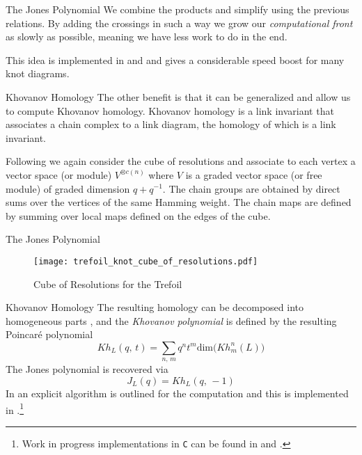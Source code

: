 \documentclass{beamer}
\begin{document}
    \begin{frame}{The Jones Polynomial}
        We combine the products and simplify using the previous relations.
        By adding the crossings in such a way we grow our
        \textit{computational front} as slowly as possible, meaning we have
        less work to do in the end.
        \par\hfill\par
        This idea is implemented in \cite{KatlasJones} and
        \cite{MaguireJones} and gives a considerable speed boost for many
        knot diagrams.
    \end{frame}
    \begin{frame}{Khovanov Homology}
        The other benefit is that it can be generalized and allow us to compute
        Khovanov homology. Khovanov homology is a link invariant that
        associates a chain complex to a link diagram, the homology of which
        is a link invariant.
        \par\hfill\par
        Following \cite{BarNatanKhovanovJones} we again consider the cube of
        resolutions and associate to each vertex a vector space (or module)
        $V^{\otimes{c(n)}}$ where $V$ is a graded vector space (or free module)
        of graded dimension $q+q^{-1}$. The chain groups are obtained by
        direct sums over the vertices of the same Hamming weight. The chain
        maps are defined by summing over local maps defined on the edges of
        the cube.
    \end{frame}
    \begin{frame}{The Jones Polynomial}
        \begin{figure}
            \centering
            \texttt{[image: trefoil\_knot\_cube\_of\_resolutions.pdf]}
            \caption{Cube of Resolutions for the Trefoil}
        \end{figure}
    \end{frame}
    \begin{frame}{Khovanov Homology}
        The resulting homology can be decomposed into homogeneous parts
        \cite{KatlasKhoHo}, and the \textit{Khovanov polynomial} is defined
        by the resulting Poincar\'{e} polynomial
        \begin{equation}
            Kh_{L}(q,\,t)=\sum_{n,\,m}q^{n}t^{m}
                \textrm{dim}\big(Kh_{m}^{n}(L)\big)
        \end{equation}
        The Jones polynomial is recovered via
        \begin{equation}
            J_{L}(q)=Kh_{L}(q,\,-1)
        \end{equation}
        In \cite{BarNatan2006FASTKH} an explicit algorithm is outlined for
        the computation and this is implemented in \cite{JavaKhv2}.\footnote{%
            Work in progress implementations in \texttt{C} can be found in
            \cite{MaguireKnotData} and \cite{MaguireLibtmpl}.
        }
    \end{frame}
\end{document}
